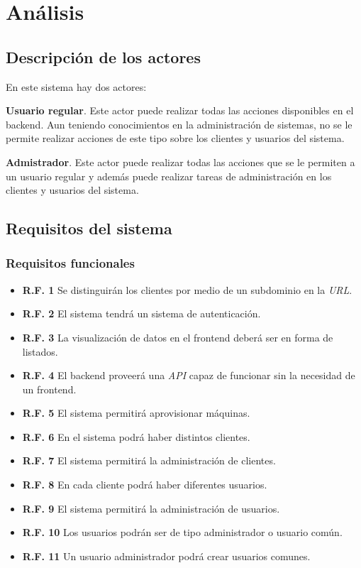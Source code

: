 \chapter{Análisis}

\section{Descripción de los actores}

En este sistema hay dos actores:

\textbf{Usuario regular}. Este actor puede realizar todas las acciones disponibles en el backend. Aun teniendo conocimientos en la administración de sistemas, no se le permite realizar acciones de este tipo sobre los clientes y usuarios del sistema.

\textbf{Admistrador}. Este actor puede realizar todas las acciones que se le permiten a un usuario regular y además puede realizar tareas de administración en los clientes y usuarios del sistema.

\section{Requisitos del sistema}

\subsection{Requisitos funcionales}
\begin{itemize}
	\item \textbf{R.F. 1} Se distinguirán los clientes por medio de un subdominio en la \textit{URL}.
	\item \textbf{R.F. 2} El sistema tendrá un sistema de autenticación.
	\item \textbf{R.F. 3} La visualización de datos en el frontend deberá ser en forma de listados.
	\item \textbf{R.F. 4} El backend proveerá una \textit{API} capaz de funcionar sin la necesidad de un frontend.
	\item \textbf{R.F. 5} El sistema permitirá aprovisionar máquinas.
	\item \textbf{R.F. 6} En el sistema podrá haber distintos clientes.
	\item \textbf{R.F. 7} El sistema permitirá la administración de clientes.
	\item \textbf{R.F. 8} En cada cliente podrá haber diferentes usuarios.
	\item \textbf{R.F. 9} El sistema permitirá la administración de usuarios.
	\item \textbf{R.F. 10} Los usuarios podrán ser de tipo administrador o usuario común.
	\item \textbf{R.F. 11} Un usuario administrador podrá crear usuarios comunes.
\end{itemize}


